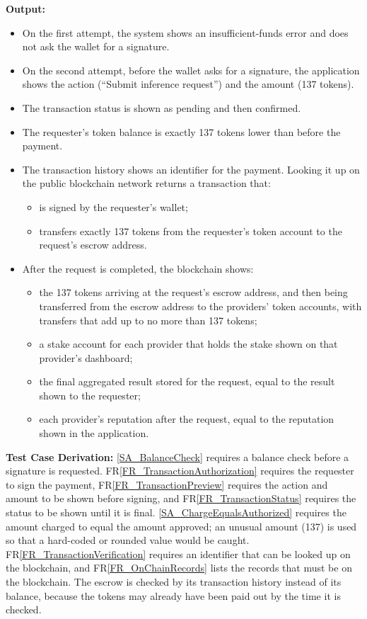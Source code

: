 \documentclass[12pt]{article}
\newcommand{\rref}[1]{FR\ref{#1}}
\newcommand{\saref}[1]{\ref{#1}}
\begin{document}
\begin{enumerate}
\textbf{Output:}
\begin{itemize}
\item[1.] On the first attempt, the system shows an insufficient-funds error and
does not ask the wallet for a signature.
\item[2.] On the second attempt, before the wallet asks for a signature, the
application shows the action (``Submit inference request'') and the amount
(137 tokens).
\item[3.] The transaction status is shown as pending and then confirmed.
\item[4.] The requester's token balance is exactly 137 tokens lower than before
the payment.
\item[5.] The transaction history shows an identifier for the payment. Looking it
up on the public blockchain network returns a transaction that:
\begin{itemize}
\item is signed by the requester's wallet;
\item transfers exactly 137 tokens from the requester's token account to the
request's escrow address.
\end{itemize}
\item[6.] After the request is completed, the blockchain shows:
\begin{itemize}
\item the 137 tokens arriving at the request's escrow address, and then being
transferred from the escrow address to the providers' token accounts, with
transfers that add up to no more than 137 tokens;
\item a stake account for each provider that holds the stake shown on that
provider's dashboard;
\item the final aggregated result stored for the request, equal to the result
shown to the requester;
\item each provider's reputation after the request, equal to the reputation
shown in the application.
\end{itemize}
\end{itemize}

\textbf{Test Case Derivation:} \saref{SA_BalanceCheck} requires a balance check before a signature is
requested. \rref{FR_TransactionAuthorization} requires the requester to sign the payment, \rref{FR_TransactionPreview} requires the action and
amount to be shown before signing, and \rref{FR_TransactionStatus} requires the status to be shown until
it is final. \saref{SA_ChargeEqualsAuthorized} requires the amount charged to equal the amount approved; an
unusual amount (137) is used so that a hard-coded or rounded value would be
caught. \rref{FR_TransactionVerification} requires an identifier that can be looked up on the blockchain, and
\rref{FR_OnChainRecords} lists the records that must be on the blockchain. The escrow is checked by
its transaction history instead of its balance, because the tokens may already
have been paid out by the time it is checked.


\end{enumerate}
\end{document}
